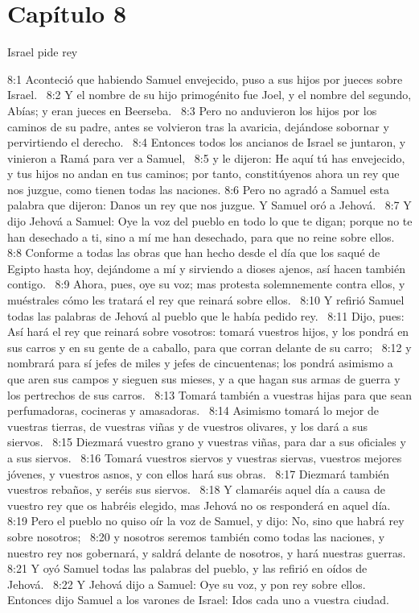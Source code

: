 \section*{Capítulo 8}
Israel pide rey  

8:1 Aconteció que habiendo Samuel envejecido, puso a sus hijos por jueces sobre Israel.  
8:2 Y el nombre de su hijo primogénito fue Joel, y el nombre del segundo, Abías; y eran jueces en Beerseba.  
8:3 Pero no anduvieron los hijos por los caminos de su padre, antes se volvieron tras la avaricia, dejándose sobornar y pervirtiendo el derecho.  
8:4 Entonces todos los ancianos de Israel se juntaron, y vinieron a Ramá para ver a Samuel,  
8:5 y le dijeron: He aquí tú has envejecido, y tus hijos no andan en tus caminos; por tanto, constitúyenos ahora un rey que nos juzgue, como tienen todas las naciones. 
8:6 Pero no agradó a Samuel esta palabra que dijeron: Danos un rey que nos juzgue. Y Samuel oró a Jehová.  
8:7 Y dijo Jehová a Samuel: Oye la voz del pueblo en todo lo que te digan; porque no te han desechado a ti, sino a mí me han desechado, para que no reine sobre ellos.  
8:8 Conforme a todas las obras que han hecho desde el día que los saqué de Egipto hasta hoy, dejándome a mí y sirviendo a dioses ajenos, así hacen también contigo.  
8:9 Ahora, pues, oye su voz; mas protesta solemnemente contra ellos, y muéstrales cómo les tratará el rey que reinará sobre ellos.  
8:10 Y refirió Samuel todas las palabras de Jehová al pueblo que le había pedido rey.  
8:11 Dijo, pues: Así hará el rey que reinará sobre vosotros: tomará vuestros hijos, y los pondrá en sus carros y en su gente de a caballo, para que corran delante de su carro;  
8:12 y nombrará para sí jefes de miles y jefes de cincuentenas; los pondrá asimismo a que aren sus campos y sieguen sus mieses, y a que hagan sus armas de guerra y los pertrechos de sus carros.  
8:13 Tomará también a vuestras hijas para que sean perfumadoras, cocineras y amasadoras.  
8:14 Asimismo tomará lo mejor de vuestras tierras, de vuestras viñas y de vuestros olivares, y los dará a sus siervos.  
8:15 Diezmará vuestro grano y vuestras viñas, para dar a sus oficiales y a sus siervos.  
8:16 Tomará vuestros siervos y vuestras siervas, vuestros mejores jóvenes, y vuestros asnos, y con ellos hará sus obras.  
8:17 Diezmará también vuestros rebaños, y seréis sus siervos.  
8:18 Y clamaréis aquel día a causa de vuestro rey que os habréis elegido, mas Jehová no os responderá en aquel día.  
8:19 Pero el pueblo no quiso oír la voz de Samuel, y dijo: No, sino que habrá rey sobre nosotros;  
8:20 y nosotros seremos también como todas las naciones, y nuestro rey nos gobernará, y saldrá delante de nosotros, y hará nuestras guerras.  
8:21 Y oyó Samuel todas las palabras del pueblo, y las refirió en oídos de Jehová.  
8:22 Y Jehová dijo a Samuel: Oye su voz, y pon rey sobre ellos. Entonces dijo Samuel a los varones de Israel: Idos cada uno a vuestra ciudad.  
